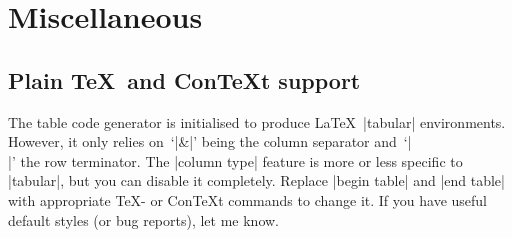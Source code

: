 \section{Miscellaneous}
\subsection{Plain \TeX\ and Con\TeX t support}
\label{sec:pgfplotstable:context}
The table code generator is initialised to produce \LaTeX\ |tabular| environments. However, it only relies on~`|&|' being the column separator and~`|\\|' the row terminator. The |column type| feature is more or less specific to |tabular|, but you can disable it completely. Replace |begin table| and |end table| with appropriate \TeX- or Con\TeX t commands to change it. If you have useful default styles (or bug reports), let me know.

\printindex



